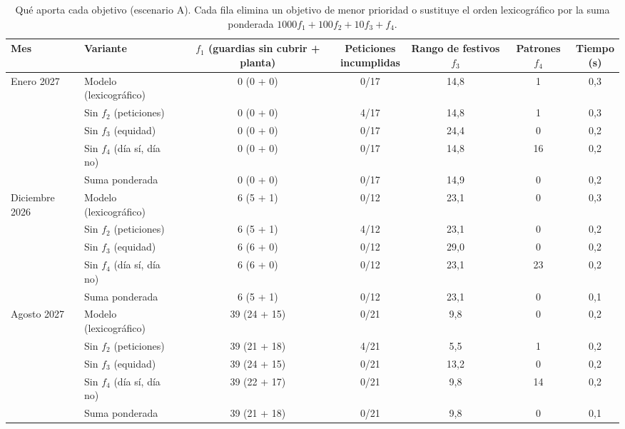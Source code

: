 \begin{table}[ht]
\centering\small
\caption{Qué aporta cada objetivo (escenario A). Cada fila elimina un objetivo de menor prioridad o sustituye el orden lexicográfico por la suma ponderada $1000 f_1 + 100 f_2 + 10 f_3 + f_4$.}
\label{tab:objetivos}
\begin{tabular}{@{}llccccc@{}}
\toprule
Mes & Variante & \makecell{$f_1$ (guardias sin\\ cubrir + planta)} & \makecell{Peticiones\\ incumplidas} & \makecell{Rango de\\ festivos $f_3$} & \makecell{Patrones\\ $f_4$} & \makecell{Tiempo\\ (s)} \\
\midrule
\multirow{5}{*}{Enero 2027} & Modelo (lexicográfico) & 0 (0 + 0) & 0/17 & 14{,}8 & 1 & 0{,}3 \\
 & Sin $f_2$ (peticiones) & 0 (0 + 0) & 4/17 & 14{,}8 & 1 & 0{,}3 \\
 & Sin $f_3$ (equidad) & 0 (0 + 0) & 0/17 & 24{,}4 & 0 & 0{,}2 \\
 & Sin $f_4$ (día sí, día no) & 0 (0 + 0) & 0/17 & 14{,}8 & 16 & 0{,}2 \\
 & Suma ponderada & 0 (0 + 0) & 0/17 & 14{,}9 & 0 & 0{,}2 \\
\midrule
\multirow{5}{*}{Diciembre 2026} & Modelo (lexicográfico) & 6 (5 + 1) & 0/12 & 23{,}1 & 0 & 0{,}3 \\
 & Sin $f_2$ (peticiones) & 6 (5 + 1) & 4/12 & 23{,}1 & 0 & 0{,}2 \\
 & Sin $f_3$ (equidad) & 6 (6 + 0) & 0/12 & 29{,}0 & 0 & 0{,}2 \\
 & Sin $f_4$ (día sí, día no) & 6 (6 + 0) & 0/12 & 23{,}1 & 23 & 0{,}2 \\
 & Suma ponderada & 6 (5 + 1) & 0/12 & 23{,}1 & 0 & 0{,}1 \\
\midrule
\multirow{5}{*}{Agosto 2027} & Modelo (lexicográfico) & 39 (24 + 15) & 0/21 & 9{,}8 & 0 & 0{,}2 \\
 & Sin $f_2$ (peticiones) & 39 (21 + 18) & 4/21 & 5{,}5 & 1 & 0{,}2 \\
 & Sin $f_3$ (equidad) & 39 (24 + 15) & 0/21 & 13{,}2 & 0 & 0{,}2 \\
 & Sin $f_4$ (día sí, día no) & 39 (22 + 17) & 0/21 & 9{,}8 & 14 & 0{,}2 \\
 & Suma ponderada & 39 (21 + 18) & 0/21 & 9{,}8 & 0 & 0{,}1 \\
\bottomrule
\end{tabular}
\end{table}
